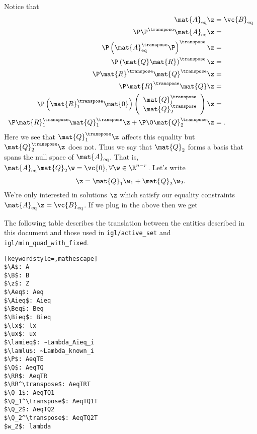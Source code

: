 \documentclass{diary}
\renewcommand{\A}{\mat{A}}
\renewcommand{\Q}{\mat{Q}}
\newcommand{\RR}{\mat{R}}
\newcommand{\Aeq}{\mat{A}_\textrm{eq}}
\newcommand{\Aieq}{\mat{A}_\textrm{ieq}}
\newcommand{\Beq}{\vc{B}_\textrm{eq}}
\newcommand{\Bieq}{\vc{B}_\textrm{ieq}}
\newcommand{\lx}{\Bell}
\newcommand{\ux}{\vc{u}}
\newcommand{\lamieq}{\lambda_\textrm{ieq}}
\newcommand{\lamlu}  {\lambda_\textrm{lu}}
\begin{document}
Notice that 
\begin{align}
\Aeq \z &= \Beq \\
\P \P^\transpose \Aeq \z &= \\
\P \left(\Aeq^\transpose \P\right)^\transpose \z &= \\
\P\left(\Q\RR\right)^\transpose \z &= \\
\P \RR^\transpose \Q^\transpose \z &= \\
\P \RR^\transpose \Q \z &= \\
\P \left(\RR_1^\transpose \mat{0}\right)
  \left(\begin{array}{c}
  \Q_1^\transpose\\
  \Q_2^\transpose
  \end{array}\right) \z &=\\
\P \RR_1^\transpose \Q_1^\transpose \z + \P \0 \Q_2^\transpose \z &= .
\end{align}
Here we see that $\Q_1^\transpose \z$ affects this equality but
$\Q_2^\transpose \z$ does not. Thus
we say that $\Q_2$ forms a basis that spans the null space of $\Aeq$. That is, $\Aeq \Q_2 \w =
\vc{0},
\forall \w \in \R^{n-r}$. Let's write 
\begin{equation}
\z = \Q_1 \w_1 + \Q_2 \w_2.
\end{equation}
We're only interested in solutions $\z$ which satisfy our equality constraints
$\Aeq \z = \Beq$. If we plug in the above then we get





The following table describes the translation between the entities described in
this document and those used in \texttt{igl/active\_set} and
\texttt{igl/min\_quad\_with\_fixed}.
\begin{lstlisting}[keywordstyle=,mathescape]
$\A$: A
$\B$: B
$\z$: Z
$\Aeq$: Aeq
$\Aieq$: Aieq
$\Beq$: Beq
$\Bieq$: Bieq
$\lx$: lx
$\ux$: ux
$\lamieq$: ~Lambda_Aieq_i
$\lamlu$: ~Lambda_known_i
$\P$: AeqTE
$\Q$: AeqTQ
$\RR$: AeqTR
$\RR^\transpose$: AeqTRT
$\Q_1$: AeqTQ1
$\Q_1^\transpose$: AeqTQ1T
$\Q_2$: AeqTQ2
$\Q_2^\transpose$: AeqTQ2T
$w_2$: lambda
\end{lstlisting}


\end{document}
